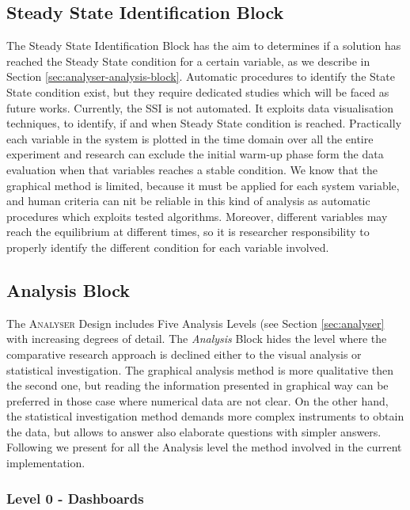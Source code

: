 \subsection{Steady State Identification Block}\label{sec:analyser-impl-ss-block}

The Steady State Identification Block has the aim to  determines if a solution has reached the Steady State condition for a certain variable, as we describe in Section \ref{sec:analyser-analysis-block}. Automatic procedures to identify the State State condition exist, but they require dedicated studies which will be faced as future works. Currently, the SSI is not automated. It exploits data visualisation techniques, to identify, if and when Steady State condition is reached. Practically each variable in the system is plotted in the time domain over all the entire experiment and research can exclude  the initial warm-up phase form the data evaluation when that variables reaches a stable condition. 
We know that the graphical method is limited, because it must be applied for each system variable, and human criteria can nit be reliable in this kind of analysis as automatic procedures which exploits tested algorithms. Moreover, different variables may reach the equilibrium at different times, so it is researcher responsibility to properly identify the different condition for each variable involved.

\subsection{Analysis Block}\label{sec:analyser-impl-analysis-block}

The \textsc{Analyser} Design includes Five Analysis Levels (see Section \ref{sec:analyser} with increasing degrees of detail. The \textit{Analysis} Block hides the level where the comparative research approach is declined either to the visual analysis or statistical investigation. The graphical analysis method is more qualitative then the second one, but reading the information presented in graphical way can be preferred in those case where numerical data are not clear. On the other hand, the statistical investigation method demands more complex instruments to obtain the data, but allows to answer also elaborate questions with simpler answers. Following we present for all the Analysis level the method involved in the current implementation.

\subsubsection{Level 0 - Dashboards}\label{sec:impl-level0}

